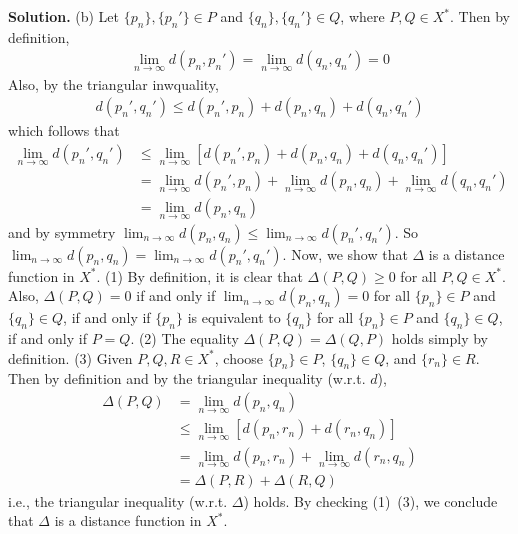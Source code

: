 \documentclass[12pt]{article}
\theoremstyle{definition}
\begin{document}
\smallskip
\noindent\textbf{Solution.}\quad
(b) Let $\{p_n\},\{p_n'\}\in P$ and $\{q_n\},\{q_n'\}\in Q$, where $P,Q\in X^\ast$. Then by definition,
\begin{align*}
\lim_{n\to\infty}d(p_n,p_n')=\lim_{n\to\infty}d(q_n,q_n')=0
\end{align*}
Also, by the triangular inwquality,
\begin{align*}
d(p_n',q_n')\le d(p_n',p_n)+d(p_n,q_n)+d(q_n,q_n')
\end{align*}
which follows that
\begin{align*}
\lim_{n\to\infty}d(p_n',q_n')
&\le\lim_{n\to\infty}\left[d(p_n',p_n)+d(p_n,q_n)+d(q_n,q_n')\right] \\
&=\lim_{n\to\infty}d(p_n',p_n)+\lim_{n\to\infty}d(p_n,q_n)+\lim_{n\to\infty}d(q_n,q_n') \\
&=\lim_{n\to\infty}d(p_n,q_n)
\end{align*}
and by symmetry $\lim_{n\to\infty}d(p_n,q_n)\le\lim_{n\to\infty}d(p_n',q_n')$. So $\lim_{n\to\infty}d(p_n,q_n)=\lim_{n\to\infty}d(p_n',q_n')$. Now, we show that $\Delta$ is a distance function in $X^\ast$. 
(1) By definition, it is clear that $\Delta(P,Q)\ge 0$ for all $P,Q\in X^\ast$. Also, $\Delta(P,Q)=0$ if and only if $\lim_{n\to\infty}d(p_n,q_n)=0$ for all $\{p_n\}\in P$ and $\{q_n\}\in Q$, if and only if $\{p_n\}$ is equivalent to $\{q_n\}$ for all $\{p_n\}\in P$ and $\{q_n\}\in Q$, if and only if $P=Q$.
(2) The equality $\Delta(P,Q)=\Delta(Q,P)$ holds simply by definition.
(3) Given $P,Q,R\in X^\ast$, choose $\{p_n\}\in P$, $\{q_n\}\in Q$, and $\{r_n\}\in R$. Then by definition and by the triangular inequality (w.r.t. $d$),
\begin{align*}
\Delta(P,Q)
&=\lim_{n\to\infty}d(p_n,q_n) \\
&\le\lim_{n\to\infty}\left[d(p_n,r_n)+d(r_n,q_n)\right] \\
&=\lim_{n\to\infty}d(p_n,r_n)+\lim_{n\to\infty}d(r_n,q_n) \\
&=\Delta(P,R)+\Delta(R,Q)
\end{align*}
i.e., the triangular inequality (w.r.t. $\Delta$) holds.
By checking (1)~(3), we conclude that $\Delta$ is a distance function in $X^\ast$.
\end{document}
